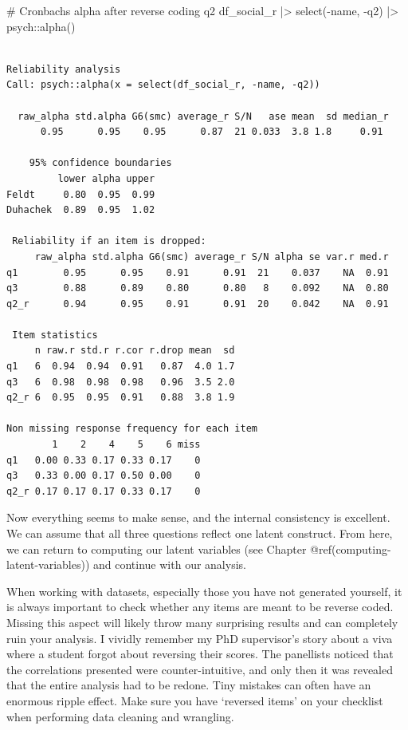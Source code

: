 \documentclass[
  letterpaper,
]{krantz}
\makeatletter
\newenvironment{Shaded}{\begin{snugshade}}{\end{snugshade}}
\newcommand{\CommentTok}[1]{\textcolor[rgb]{0.37,0.37,0.37}{#1}}
\newcommand{\FunctionTok}[1]{\textcolor[rgb]{0.28,0.35,0.67}{#1}}
\newcommand{\NormalTok}[1]{\textcolor[rgb]{0.00,0.23,0.31}{#1}}
\newcommand{\SpecialCharTok}[1]{\textcolor[rgb]{0.37,0.37,0.37}{#1}}
\newenvironment{kframe}{%
\medskip{}
\setlength{\fboxsep}{.8em}
 \def\at@end@of@kframe{}%
 \ifinner\ifhmode%
  \def\at@end@of@kframe{\end{minipage}}%
  \begin{minipage}{\columnwidth}%
 \fi\fi%
 \def\FrameCommand##1{\hskip\@totalleftmargin \hskip-\fboxsep
 \colorbox{shadecolor}{##1}\hskip-\fboxsep
     \hskip-\linewidth \hskip-\@totalleftmargin \hskip\columnwidth}%
 \MakeFramed {\advance\hsize-\width
   \@totalleftmargin\z@ \linewidth\hsize
   \@setminipage}}%
 {\par\unskip\endMakeFramed%
 \at@end@of@kframe}
\renewenvironment{Shaded}{\begin{kframe}}{\end{kframe}}
\makeatother
\begin{document}
\begin{Shaded}
\begin{Highlighting}[]
\CommentTok{\# Cronbach\textquotesingle{}s alpha after reverse coding q2}
\NormalTok{df\_social\_r }\SpecialCharTok{|\textgreater{}}
  \FunctionTok{select}\NormalTok{(}\SpecialCharTok{{-}}\NormalTok{name, }\SpecialCharTok{{-}}\NormalTok{q2) }\SpecialCharTok{|\textgreater{}}
\NormalTok{  psych}\SpecialCharTok{::}\FunctionTok{alpha}\NormalTok{()}
\end{Highlighting}
\end{Shaded}

\begin{verbatim}

Reliability analysis   
Call: psych::alpha(x = select(df_social_r, -name, -q2))

  raw_alpha std.alpha G6(smc) average_r S/N   ase mean  sd median_r
      0.95      0.95    0.95      0.87  21 0.033  3.8 1.8     0.91

    95% confidence boundaries 
         lower alpha upper
Feldt     0.80  0.95  0.99
Duhachek  0.89  0.95  1.02

 Reliability if an item is dropped:
     raw_alpha std.alpha G6(smc) average_r S/N alpha se var.r med.r
q1        0.95      0.95    0.91      0.91  21    0.037    NA  0.91
q3        0.88      0.89    0.80      0.80   8    0.092    NA  0.80
q2_r      0.94      0.95    0.91      0.91  20    0.042    NA  0.91

 Item statistics 
     n raw.r std.r r.cor r.drop mean  sd
q1   6  0.94  0.94  0.91   0.87  4.0 1.7
q3   6  0.98  0.98  0.98   0.96  3.5 2.0
q2_r 6  0.95  0.95  0.91   0.88  3.8 1.9

Non missing response frequency for each item
        1    2    4    5    6 miss
q1   0.00 0.33 0.17 0.33 0.17    0
q3   0.33 0.00 0.17 0.50 0.00    0
q2_r 0.17 0.17 0.17 0.33 0.17    0
\end{verbatim}

Now everything seems to make sense, and the internal consistency is
excellent. We can assume that all three questions reflect one latent
construct. From here, we can return to computing our latent variables
(see Chapter @ref(computing-latent-variables)) and continue with our
analysis.

When working with datasets, especially those you have not generated
yourself, it is always important to check whether any items are meant to
be reverse coded. Missing this aspect will likely throw many surprising
results and can completely ruin your analysis. I vividly remember my PhD
supervisor's story about a viva where a student forgot about reversing
their scores. The panellists noticed that the correlations presented
were counter-intuitive, and only then it was revealed that the entire
analysis had to be redone. Tiny mistakes can often have an enormous
ripple effect. Make sure you have `reversed items' on your checklist
when performing data cleaning and wrangling.
\end{document}
